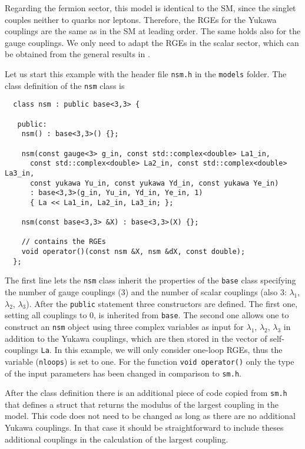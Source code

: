 \documentclass[11pt,a4paper]{article}
\begin{document}
Regarding the fermion sector, this model is identical to the SM, since the singlet couples neither to quarks nor leptons. Therefore, the RGEs for the Yukawa couplings are the same as in the SM at leading order.
The same holds also for the gauge couplings. We only need to adapt the RGEs in the scalar sector, which can be obtained from the general results in \cite{Machacek:1984zw,Poole:2019kcm}.

Let us start this example with the header file \texttt{nsm.h} in the \texttt{models} folder. The class definition of the \texttt{nsm} class is
\begin{lstlisting}
  class nsm : public base<3,3> {
  
   public:
    nsm() : base<3,3>() {};

    nsm(const gauge<3> g_in, const std::complex<double> La1_in,
      const std::complex<double> La2_in, const std::complex<double> La3_in,
      const yukawa Yu_in, const yukawa Yd_in, const yukawa Ye_in)
      : base<3,3>(g_in, Yu_in, Yd_in, Ye_in, 1)
      { La << La1_in, La2_in, La3_in; };

    nsm(const base<3,3> &X) : base<3,3>(X) {};
 
    // contains the RGEs
    void operator()(const nsm &X, nsm &dX, const double);
  };
\end{lstlisting}
The first line lets the \texttt{nsm} class inherit the properties of the \texttt{base} class specifying the number of gauge couplings (3) and the number of scalar couplings (also 3: $\lambda_1$, $\lambda_2$, $\lambda_3$).
After the \texttt{public} statement three constructors are defined. The first one, setting all couplings to 0, is inherited from \texttt{base}.
The second one allows one to construct an \texttt{nsm} object using three complex variables as input for $\lambda_1$, $\lambda_2$, $\lambda_3$ in addition to the Yukawa couplings,
which are then stored in the vector of self-couplings \texttt{La}.
In this example, we will only consider one-loop RGEs, thus the variable (\texttt{nloops}) is set to one.
For the function \texttt{void operator()} only the type of the input parameters has been changed in comparison to \texttt{sm.h}.

After the class definition there is an additional piece of code copied from \texttt{sm.h} that defines a struct that returns the modulus of the largest coupling in the model. This code does not need to be changed as long as there are no additional Yukawa couplings. In that case it should be straightforward to include theses additional couplings in the calculation of the largest coupling.
\end{document}
